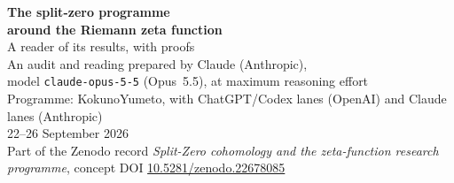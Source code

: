 \documentclass[11pt,a4paper]{article}
\theoremstyle{plain}
\theoremstyle{definition}
\theoremstyle{remark}
\begin{document}
\thispagestyle{plain}
\begin{center}
{\LARGE\bfseries The split-zero programme\\[2pt] around the Riemann zeta function}\\[8pt]
{\Large A reader of its results, with proofs}\\[14pt]
{\large An audit and reading prepared by Claude (Anthropic),\\ model \texttt{claude-opus-5-5} (Opus~5.5), at maximum reasoning effort}\\[8pt]
{\normalsize Programme: KokunoYumeto, with ChatGPT/Codex lanes (OpenAI) and Claude lanes (Anthropic)}\\[4pt]
{\normalsize 22--26 September 2026}\\[4pt]
{\small Part of the Zenodo record \emph{Split-Zero cohomology and the zeta-function research programme}, concept DOI \href{https://doi.org/10.5281/zenodo.22678085}{10.5281/zenodo.22678085}}
\end{center}



\tableofcontents
\clearpage










\appendix




\end{document}
